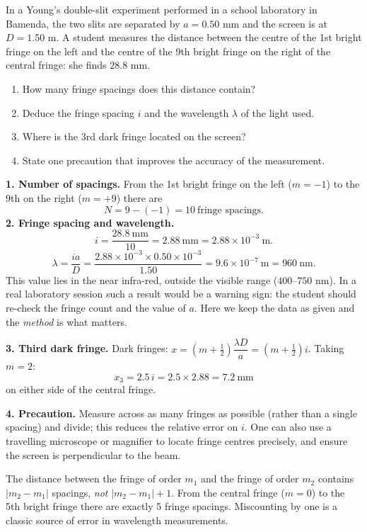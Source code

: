 \documentclass[11pt]{article}
\begin{document}
\begin{exoresolu}
In a Young's double-slit experiment performed in a school laboratory in Bamenda, the two slits are separated by $a=0.50$ mm and the screen is at $D=1.50$ m. A student measures the distance between the centre of the 1st bright fringe on the left and the centre of the 9th bright fringe on the right of the central fringe: she finds $28.8$ mm.
\begin{enumerate}
\item How many fringe spacings does this distance contain?
\item Deduce the fringe spacing $i$ and the wavelength $\lambda$ of the light used.
\item Where is the 3rd dark fringe located on the screen?
\item State one precaution that improves the accuracy of the measurement.
\end{enumerate}
\tcblower
\textbf{1. Number of spacings.} From the 1st bright fringe on the left ($m=-1$) to the 9th on the right ($m=+9$) there are
\[
N = 9-(-1)=10\ \text{fringe spacings}.
\]
\textbf{2. Fringe spacing and wavelength.}
\[
i=\frac{28.8\ \mathrm{mm}}{10}=2.88\ \mathrm{mm}=2.88\times10^{-3}\ \mathrm{m}.
\]
\[
\lambda=\frac{ia}{D}=\frac{2.88\times10^{-3}\times0.50\times10^{-3}}{1.50}
=9.6\times10^{-7}\ \mathrm{m}=960\ \mathrm{nm}.
\]
This value lies in the near infra-red, outside the visible range ($400$--$750$ nm). In a real laboratory session such a result would be a warning sign: the student should re-check the fringe count and the value of $a$. Here we keep the data as given and the \emph{method} is what matters.

\textbf{3. Third dark fringe.} Dark fringes: $x=\left(m+\tfrac12\right)\dfrac{\lambda D}{a}=\left(m+\tfrac12\right)i$. Taking $m=2$:
\[
x_3 = 2.5\,i = 2.5\times 2.88 = 7.2\ \mathrm{mm}
\]
on either side of the central fringe.

\textbf{4. Precaution.} Measure across as many fringes as possible (rather than a single spacing) and divide; this reduces the relative error on $i$. One can also use a travelling microscope or magnifier to locate fringe centres precisely, and ensure the screen is perpendicular to the beam.
\end{exoresolu}

\begin{attention}
The distance between the fringe of order $m_1$ and the fringe of order $m_2$ contains $|m_2-m_1|$ spacings, \emph{not} $|m_2-m_1|+1$. From the central fringe ($m=0$) to the 5th bright fringe there are exactly 5 fringe spacings. Miscounting by one is a classic source of error in wavelength measurements.
\end{attention}
\end{document}
